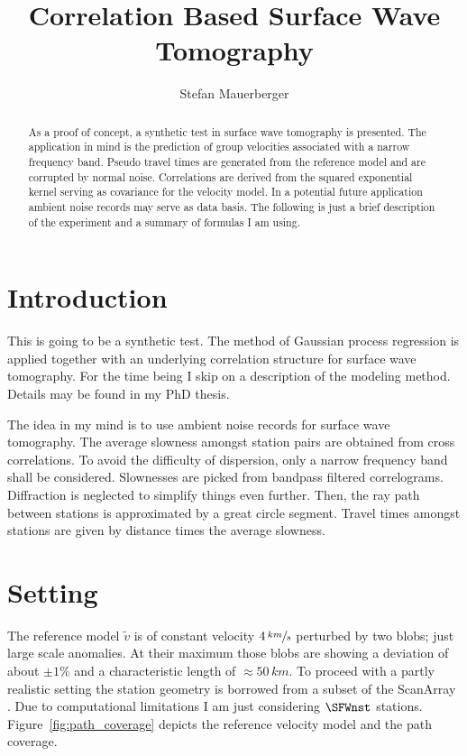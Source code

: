 \documentclass[11pt]{article}
\title{Correlation Based Surface Wave Tomography}
\author{Stefan Mauerberger}
\begin{document}
\maketitle
\begin{abstract}
    As a proof of concept, a synthetic test in surface wave tomography is presented.
    The application in mind is the prediction of group velocities associated with a narrow frequency band.
    Pseudo travel times are generated from the reference model and are corrupted by normal noise.
    Correlations are derived from the squared exponential kernel serving as covariance for the velocity model.
    In a potential future application ambient noise records may serve as data basis.
    The following is just a brief description of the experiment and a summary of formulas I am using.
\end{abstract}

\section{Introduction}


This is going to be a synthetic test.
The method of Gaussian process regression is applied together with an underlying correlation structure for surface wave tomography.
For the time being I skip on a description of the modeling method.
Details may be found in my PhD thesis.

The idea in my mind is to use ambient noise records for surface wave tomography.
The average slowness amongst station pairs are obtained from cross correlations.
To avoid the difficulty of dispersion, only a narrow frequency band shall be considered.
Slownesses are picked from bandpass filtered correlograms.
Diffraction is neglected to simplify things even further.
Then, the ray path between stations is approximated by a great circle segment.
Travel times amongst stations are given by distance times the average slowness.

\section{Setting}

The reference model $\tilde v$ is of constant velocity $4\,\sfrac{km}s$ perturbed by two blobs; just large scale anomalies.
At their maximum those blobs are showing a deviation of about $\pm 1\%$ and a characteristic length of $\approx\!50\,km$.
To proceed with a partly realistic setting the station geometry is borrowed from a subset of the ScanArray \parencite{ScanArray2017}.
Due to computational limitations I am just considering $\SFWnst$ stations.
Figure~\ref{fig:path_coverage} depicts the reference velocity model and the path coverage.
\end{document}
